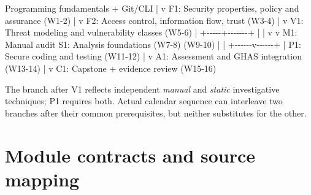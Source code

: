 \documentclass[
  letterpaper,
]{article}
\newenvironment{Shaded}{}{}
\newcommand{\NormalTok}[1]{#1}
\begin{document}
\begin{Shaded}
\begin{Highlighting}[]
\NormalTok{Programming fundamentals + Git/CLI}
\NormalTok{              |}
\NormalTok{              v}
\NormalTok{F1: Security properties, policy and assurance (W1{-}2)}
\NormalTok{              |}
\NormalTok{              v}
\NormalTok{F2: Access control, information flow, trust (W3{-}4)}
\NormalTok{              |}
\NormalTok{              v}
\NormalTok{V1: Threat modeling and vulnerability classes (W5{-}6)}
\NormalTok{              |}
\NormalTok{        +{-}{-}{-}{-}{-}+{-}{-}{-}{-}{-}{-}{-}+}
\NormalTok{        |             |}
\NormalTok{        v             v}
\NormalTok{M1: Manual audit   S1: Analysis foundations}
\NormalTok{    (W7{-}8)             (W9{-}10)}
\NormalTok{        |             |}
\NormalTok{        +{-}{-}{-}{-}{-}{-}v{-}{-}{-}{-}{-}{-}+}
\NormalTok{               |}
\NormalTok{    P1: Secure coding and testing (W11{-}12)}
\NormalTok{               |}
\NormalTok{               v}
\NormalTok{    A1: Assessment and GHAS integration (W13{-}14)}
\NormalTok{               |}
\NormalTok{               v}
\NormalTok{       C1: Capstone + evidence review (W15{-}16)}
\end{Highlighting}
\end{Shaded}

The branch after V1 reflects independent \emph{manual} and \emph{static}
investigative techniques; P1 requires both. Actual calendar sequence can
interleave two branches after their common prerequisites, but neither
substitutes for the other.

\section{Module contracts and source
mapping}\label{module-contracts-and-source-mapping}
\end{document}
